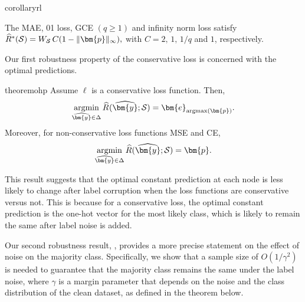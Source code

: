 \documentclass[letterpaper]{article} %
\newcommand{\bp}{{\bm{p}}}
\newcommand{\by}{{\bm{y}}}
\newcommand{\be}{{\bm{e}}}
\newcommand{\cP}{{\cal{P}}}
\newcommand{\cS}{{\cal{S}}}
\newcommand{\simplex}{\Delta}
\newcommand{\argmax}{\mathrm{argmax}}
\newcommand{\argmin}{\mathrm{argmin}}
\newtheorem{corollary}{Corollary}[theorem]
\begin{document}
\begin{restatable}[]{corollary}{rl}
\label{cor:robust_losses}

    The MAE, 01 loss, GCE $(q\geq 1)$ and infinity norm loss satisfy
    $
        \widehat{R}^*(\cS) = W_{\cS}\, C(1-\|\bp\|_\infty),
    $
    with $C=2,\,1,\,1/q$ and $1$, respectively.
\end{restatable}

Our first robustness property of the conservative loss is concerned with the
optimal predictions.


\begin{restatable}[]{theorem}{ohp}
\label{cor:one-hot-predictions}
    Assume $\ell$ is a conservative loss function. Then,
    \[\underset{\widehat{\by}\in \simplex}{\argmin}\,\widehat{R}_{}(\widehat{\by};\cS) = \be_{\argmax(\bp)}.\]
    Moreover, for non-conservative loss functions MSE and CE,
    \[
        \underset{\widehat{\by} \in \simplex}{\argmin}\,\widehat{R}(\widehat{\by};\cS) = \bp.
    \]
\end{restatable}
This result suggests that the optimal constant prediction at each node is less
likely to change after label corruption when the loss functions are conservative
versus not.
This is because for a conservative loss, the optimal constant prediction is the
one-hot vector for the most likely class, which is likely to remain the same
after label noise is added.

Our second robustness result, , provides a more precise
statement on the effect of noise on the majority class.
Specifically, we show that a sample size of $O(1/\gamma^{2})$ is needed to
guarantee that the majority class remains the same under the label noise, where
$\gamma$ is a margin parameter that depends on the noise and the class
distribution of the clean dataset, as defined in the theorem below.
\end{document}
